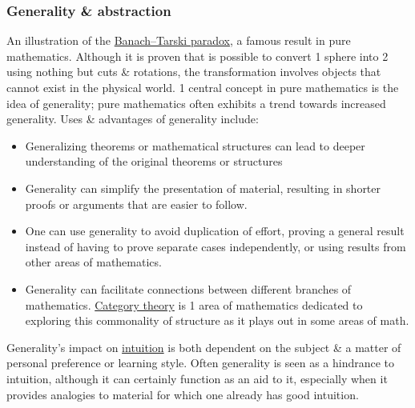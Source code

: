 \documentclass{article}
\begin{document}
\subsubsection{Generality \& abstraction}
{\sf An illustration of the \href{https://en.wikipedia.org/wiki/Banach%E2%80%93Tarski_paradox}{Banach--Tarski paradox}, a famous result in pure mathematics. Although it is proven that is possible to convert 1 sphere into 2 using nothing but cuts \& rotations, the transformation involves objects that cannot exist in the physical world.} 1 central concept in pure mathematics is the idea of generality; pure mathematics often exhibits a trend towards increased generality. Uses \& advantages of generality include:
\begin{itemize}
	\item Generalizing theorems or mathematical structures can lead to deeper understanding of the original theorems or structures
	\item Generality can simplify the presentation of material, resulting in shorter proofs or arguments that are easier to follow.
	\item One can use generality to avoid duplication of effort, proving a general result instead of having to prove separate cases independently, or using results from other areas of mathematics.
	\item Generality can facilitate connections between different branches of mathematics. \href{https://en.wikipedia.org/wiki/Category_theory}{Category theory} is 1 area of mathematics dedicated to exploring this commonality of structure as it plays out in some areas of math.
\end{itemize}
Generality's impact on \href{https://en.wikipedia.org/wiki/Intuition_(knowledge)}{intuition} is both dependent on the subject \& a matter of personal preference or learning style. Often generality is seen as a hindrance to intuition, although it can certainly function as an aid to it, especially when it provides analogies to material for which one already has good intuition.
\end{document}
